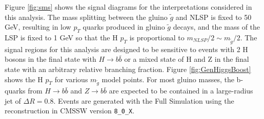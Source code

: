 Figure \ref{fig:sms} shows the signal diagrams for the interpretations considered in this analysis. The mass splitting between the gluino $\tilde{g}$ and NLSP is fixed to 50 GeV, resulting in low $p_{T}$ quarks produced in gluino $\tilde{g}$ decays, and the mass of the LSP is fixed to 1 GeV so that the H $p_{T}$ is proportional to $m_{NLSP}/2 \sim m_{\tilde{g}}/2$. The signal regions for this analysis are designed to be sensitive to events with 2 H bosons in the final state with $H \rightarrow b\bar{b}$ or a mixed state of H and Z in the final state with an arbitrary relative branching fraction. Figure \ref{fig:GenHiggsBoost} shows the H $p_{T}$ for various $m_{\tilde{g}}$ model points. For most gluino masses, the b-quarks from $H \rightarrow b\bar{b}$ and $Z \rightarrow b\bar{b}$ are expected to be contained in a large-radius jet of $\Delta R=0.8$. Events are generated with the Full Simulation using the reconstruction in CMSSW version \texttt{8\_0\_X}.
